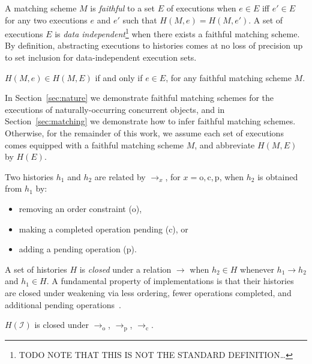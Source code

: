 A matching scheme $M$ is \emph{faithful} to a set $E$ of executions when $e \in
E$ if{f} $e' \in E$ for any two executions $e$ and $e'$ such that $H(M,e) =
H(M,e')$. A set of executions $E$ is \emph{data independent}\footnote{TODO NOTE
THAT THIS IS NOT THE STANDARD DEFINITION…} when there exists a faithful
matching scheme. By definition, abstracting executions to histories comes at no
loss of precision up to set inclusion for data-independent execution sets.

\begin{lemma}

  $H(M,e) \in H(M,E)$ if and only if $e \in E$, for any faithful matching
  scheme $M$.

\end{lemma}

In Section~\ref{sec:nature} we demonstrate faithful matching schemes for the
executions of naturally-occurring concurrent objects, and in
Section~\ref{sec:matching} we demonstrate how to infer faithful matching
schemes. Otherwise, for the remainder of this work, we assume each set of
executions comes equipped with a faithful matching scheme $M$, and abbreviate
$H(M,E)$ by $H(E)$.

Two histories $h_1$ and $h_2$ are related by $\to_x$, for $x = \mathrm{o},
\mathrm{c}, \mathrm{p}$, when $h_2$ is obtained from $h_1$ by:
\begin{itemize}

  \item removing an order constraint (o),

  \item making a completed operation pending (c), or

  \item adding a pending operation (p).

\end{itemize}
A set of histories $H$ is \emph{closed} under a relation $\to$ when $h_2 \in H$
whenever $h_1 \to h_2$ and $h_1 \in H$. A fundamental property of
implementations is that their histories are closed under weakening via less
ordering, fewer operations completed, and additional pending
operations~\cite{conf/popl/BouajjaniEEH15}.

\begin{lemma}

  $H(\mathcal{I})$ is closed under $\to_\mathrm{o}$, $\to_\mathrm{p}$, 
  $\to_\mathrm{c}$.

\end{lemma}

